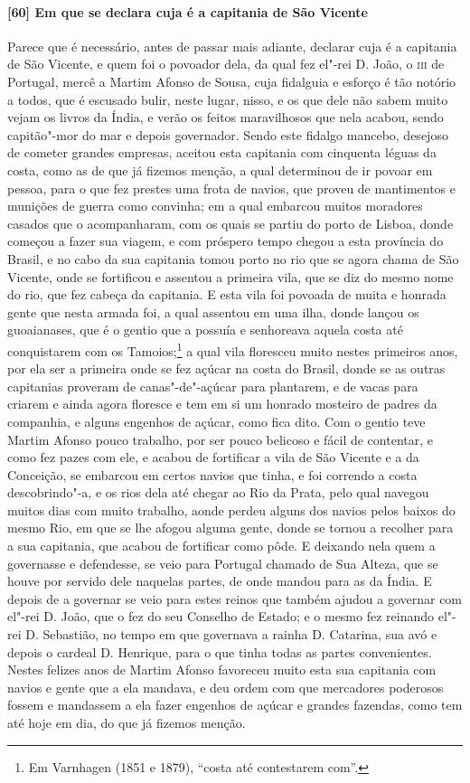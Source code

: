 \paragraph{[60] Em que se declara cuja é a capitania de São Vicente} \quad
Parece que é necessário, antes de passar mais adiante, declarar cuja é a capitania de São
Vicente, e quem foi o povoador dela, da qual fez el"-rei D. João, o \textsc{iii} de
Portugal, mercê a Martim Afonso de Sousa, cuja fidalguia e esforço é tão notório a todos,
que é escusado bulir, neste lugar, nisso, e os que dele não sabem muito vejam os livros da
Índia, e verão os feitos maravilhosos que nela acabou, sendo capitão"-mor do mar e depois
governador. Sendo este fidalgo mancebo, desejoso de cometer grandes empresas, aceitou esta
capitania com cinquenta léguas da costa, como as de que já fizemos menção, a qual
determinou de ir povoar em pessoa, para o que fez prestes uma frota de navios, que proveu
de mantimentos e munições de guerra como convinha; em a qual embarcou muitos moradores
casados que o acompanharam, com os quais se partiu do porto de Lisboa, donde começou a
fazer sua viagem, e com próspero tempo chegou a esta província do Brasil, e no cabo da sua
capitania tomou porto no rio que se agora chama de São Vicente, onde se fortificou e
assentou a primeira vila, que se diz do mesmo nome do rio, que fez cabeça da capitania. E
esta vila foi povoada de muita e honrada gente que nesta armada foi, a qual assentou em
uma ilha, donde lançou os guoaianases, que é o gentio que a possuía e senhoreava aquela
costa até conquistarem com os Tamoios;\footnote{ Em Varnhagen (1851 e 1879), ``costa até
contestarem com''.} a qual vila floresceu muito nestes primeiros anos, por ela ser a
primeira onde se fez açúcar na costa do Brasil, donde se as outras capitanias proveram de
canas"-de"-açúcar para plantarem, e de vacas para criarem e ainda agora floresce e tem em si
um honrado mosteiro de padres da companhia, e alguns engenhos de açúcar, como fica dito.
Com o gentio teve Martim Afonso pouco trabalho, por ser pouco belicoso e fácil de
contentar, e como fez pazes com ele, e acabou de fortificar a vila de São Vicente e a da
Conceição, se embarcou em certos navios que tinha, e foi correndo a costa descobrindo"-a, e
os rios dela até chegar ao Rio da Prata, pelo qual navegou muitos dias com muito trabalho,
aonde perdeu alguns dos navios pelos baixos do mesmo Rio, em que se lhe afogou alguma
gente, donde se tornou a recolher para a sua capitania, que acabou de fortificar como
pôde. E deixando nela quem a governasse e defendesse, se veio para Portugal chamado de Sua
Alteza, que se houve por servido dele naquelas partes, de onde mandou para as da Índia. E
depois de a governar se veio para estes reinos que também ajudou a governar com el"-rei D.
João, que o fez do seu Conselho de Estado; e o mesmo fez reinando el"-rei D. Sebastião, no
tempo em que governava a rainha D. Catarina, sua avó e depois o cardeal D. Henrique, para
o que tinha todas as partes convenientes. Nestes felizes anos de Martim Afonso favoreceu
muito esta sua capitania com navios e gente que a ela mandava, e deu ordem com que
mercadores poderosos fossem e mandassem a ela fazer engenhos de açúcar e grandes fazendas,
como tem até hoje em dia, do que já fizemos menção.

